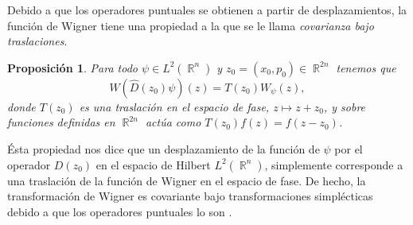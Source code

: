 \documentclass[a4paper]{report}
\DeclareMathOperator{\R}{\mathbb{R}}
\DeclareMathOperator{\Sz}{\mathcal S}
\newtheorem{proposition}{Proposición}
\begin{document}
  Debido a que los operadores puntuales se obtienen a partir
  de desplazamientos, la función de Wigner tiene una
  propiedad a la que se le llama \textit{covarianza bajo
  traslaciones}. 
  \begin{proposition}
    Para todo $\psi \in L^2(\R^{n})$ y $z_0 = (x_0,p_0) \in
    \R^{2n}$ tenemos que
    \begin{equation}
      W(\hat{D}(z_0)\psi)(z)
      = T(z_0)W_\psi(z),
    \end{equation} 
    donde $T(z_0)$ es una traslación en el espacio de fase,
    $z \mapsto z + z_0$, y sobre funciones definidas en
    $\R^{2n}$ actúa como $T(z_0)f(z) = f(z-z_0)$.
  \end{proposition}
  Ésta propiedad nos dice que un desplazamiento de la
  función de $\psi$ por el operador $D(z_0)$ en el espacio
  de Hilbert $L^2(\R^{n})$, simplemente corresponde a una
  traslación de la función de Wigner en el espacio de fase.
  De hecho, la transformación de Wigner es covariante bajo
  transformaciones simplécticas debido a que los operadores
  puntuales lo son \cite{gosson2017}.
  
\end{document}
